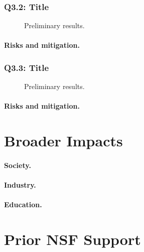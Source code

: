 \documentclass{nsf}
\begin{document}
\subsubsection{Q3.2: Title}
\label{sec:q32}

\begin{wrapfigure}[14]{r}{.5\textwidth}
  \centering
  \caption{Preliminary results.}
  \label{fig:q32fig}
\end{wrapfigure}
\lipsum[1-3]
\paragraph{Risks and mitigation.}
\lipsum[4]

\subsubsection{Q3.3: Title}
\label{sec:q33}

\begin{wrapfigure}[14]{r}{.5\textwidth}
  \centering
  \caption{Preliminary results.}
  \label{fig:q33fig}
\end{wrapfigure}
\lipsum[1-3]
\paragraph{Risks and mitigation.}
\lipsum[4]

\section{Broader Impacts}
\label{sec:broaderimpacts}

\paragraph{Society.}
\lipsum[1]

\paragraph{Industry.}
\lipsum[1]

\paragraph{Education.}
\lipsum[1]

\section{Prior NSF Support}
\label{sec:priornsfsupport}

\lipsum[1]
\end{document}
